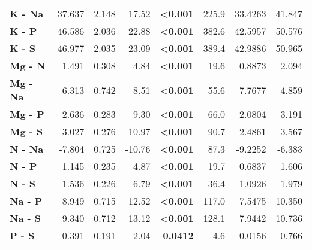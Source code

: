 \begin{table}[H]
\begin{tabular}[t]{>{}lrrr>{}rrrr}
\textbf{K - Na} & 37.637 & 2.148 & 17.52 & \textbf{<0.001} & 225.9 & 33.4263 & 41.847\\
\textbf{K - P} & 46.586 & 2.036 & 22.88 & \textbf{<0.001} & 382.6 & 42.5957 & 50.576\\
\textbf{K - S} & 46.977 & 2.035 & 23.09 & \textbf{<0.001} & 389.4 & 42.9886 & 50.965\\
\textbf{Mg - N} & 1.491 & 0.308 & 4.84 & \textbf{<0.001} & 19.6 & 0.8873 & 2.094\\
\textbf{Mg - Na} & -6.313 & 0.742 & -8.51 & \textbf{<0.001} & 55.6 & -7.7677 & -4.859\\
\textbf{Mg - P} & 2.636 & 0.283 & 9.30 & \textbf{<0.001} & 66.0 & 2.0804 & 3.191\\
\textbf{Mg - S} & 3.027 & 0.276 & 10.97 & \textbf{<0.001} & 90.7 & 2.4861 & 3.567\\
\textbf{N - Na} & -7.804 & 0.725 & -10.76 & \textbf{<0.001} & 87.3 & -9.2252 & -6.383\\
\textbf{N - P} & 1.145 & 0.235 & 4.87 & \textbf{<0.001} & 19.7 & 0.6837 & 1.606\\
\textbf{N - S} & 1.536 & 0.226 & 6.79 & \textbf{<0.001} & 36.4 & 1.0926 & 1.979\\
\textbf{Na - P} & 8.949 & 0.715 & 12.52 & \textbf{<0.001} & 117.0 & 7.5475 & 10.350\\
\textbf{Na - S} & 9.340 & 0.712 & 13.12 & \textbf{<0.001} & 128.1 & 7.9442 & 10.736\\
\textbf{P - S} & 0.391 & 0.191 & 2.04 & \textbf{0.0412} & 4.6 & 0.0156 & 0.766\\
\bottomrule
\end{tabular}
\end{table}
